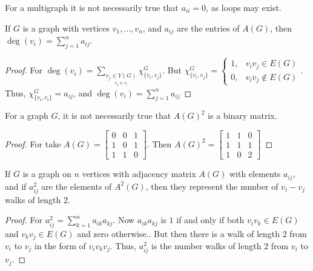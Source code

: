         \begin{remark}
        For a multigraph it is not necessarily true that $a_{ii}=0$, as loops may exist.
        \end{remark}
        \begin{corollary}
        If $G$ is a graph with vertices $v_1,\hdots, v_n$, and $a_{ij}$ are the entries of $A(G)$, then $\deg(v_i) = \sum_{j=1}^{n} a_{ij}$.
        \end{corollary}
        \begin{proof}
        For $\deg(v_i) = \sum_{\underset{v_j\ne v_i}{v_j\in V(G)}}\chi_{\{v_i,v_j\}}^G$. But $\chi_{\{v_i,v_j\}}^G = \begin{cases} 1, & v_iv_j\in E(G)\\ 0, & v_iv_j \notin E(G)\end{cases}$. Thus, $\chi_{\{v_i,v_i\}}^G = a_{ij}$, and $\deg(v_i) = \sum_{j=1}^{n} a_{ij}$
        \end{proof}
        \begin{theorem}
        For a graph $G$, it is not necessarily true that $A(G)^2$ is a binary matrix.
        \end{theorem}
        \begin{proof}
        For take $A(G) = \begin{bmatrix} 0 & 0 & 1 \\ 1 & 0 & 1 \\ 1& 1 & 0 \end{bmatrix}$. Then $A(G)^2 = \begin{bmatrix} 1 & 1 & 0 \\ 1 & 1 & 1 \\ 1 & 0 & 2 \end{bmatrix}$
        \end{proof}
        \begin{theorem}
        If $G$ is a graph on $n$ vertices with adjacency matrix $A(G)$ with elements $a_{ij}$, and if $a^2_{ij}$ are the elements of $A^2(G)$, then they represent the number of $v_{i}-v_{j}$ walks of length $2$.
        \end{theorem}
        \begin{proof}
        For $a^2_{ij} = \sum_{k=1}^{n} a_{ik}a_{kj}$. Now $a_{ik}a_{kj}$ is $1$ if and only if both $v_iv_k \in E(G)$ and $v_kv_j \in E(G)$ and zero otherwise.. But then there is a walk of length $2$ from $v_i$ to $v_j$ in the form of $v_i v_k v_j$. Thus, $a^2_{ij}$ is the number walks of length $2$ from $v_i$ to $v_j$.
        \end{proof} 
